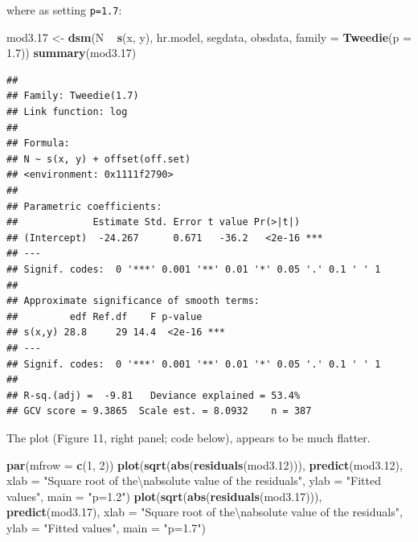 \documentclass[]{amsart}
\newenvironment{Shaded}{}{}
\newcommand{\KeywordTok}[1]{\textcolor[rgb]{0.00,0.44,0.13}{\textbf{{#1}}}}
\newcommand{\DataTypeTok}[1]{\textcolor[rgb]{0.56,0.13,0.00}{{#1}}}
\newcommand{\DecValTok}[1]{\textcolor[rgb]{0.25,0.63,0.44}{{#1}}}
\newcommand{\FloatTok}[1]{\textcolor[rgb]{0.25,0.63,0.44}{{#1}}}
\newcommand{\CharTok}[1]{\textcolor[rgb]{0.25,0.44,0.63}{{#1}}}
\newcommand{\StringTok}[1]{\textcolor[rgb]{0.25,0.44,0.63}{{#1}}}
\newcommand{\NormalTok}[1]{{#1}}
\begin{document}
where as setting \texttt{p=1.7}:

\begin{Shaded}
\begin{Highlighting}[]
\NormalTok{mod3}\FloatTok{.17} \NormalTok{<-}\StringTok{ }\KeywordTok{dsm}\NormalTok{(N ~}\StringTok{ }\KeywordTok{s}\NormalTok{(x, y), hr.model, segdata, obsdata, }
    \DataTypeTok{family =} \KeywordTok{Tweedie}\NormalTok{(}\DataTypeTok{p =} \FloatTok{1.7}\NormalTok{))}
\KeywordTok{summary}\NormalTok{(mod3}\FloatTok{.17}\NormalTok{)}
\end{Highlighting}
\end{Shaded}

\begin{verbatim}
## 
## Family: Tweedie(1.7) 
## Link function: log 
## 
## Formula:
## N ~ s(x, y) + offset(off.set)
## <environment: 0x1111f2790>
## 
## Parametric coefficients:
##             Estimate Std. Error t value Pr(>|t|)    
## (Intercept)  -24.267      0.671   -36.2   <2e-16 ***
## ---
## Signif. codes:  0 '***' 0.001 '**' 0.01 '*' 0.05 '.' 0.1 ' ' 1
## 
## Approximate significance of smooth terms:
##         edf Ref.df    F p-value    
## s(x,y) 28.8     29 14.4  <2e-16 ***
## ---
## Signif. codes:  0 '***' 0.001 '**' 0.01 '*' 0.05 '.' 0.1 ' ' 1
## 
## R-sq.(adj) =  -9.81   Deviance explained = 53.4%
## GCV score = 9.3865  Scale est. = 8.0932    n = 387
\end{verbatim}

The plot (Figure 11, right panel; code below), appears to be much
flatter.

\begin{Shaded}
\begin{Highlighting}[]
\KeywordTok{par}\NormalTok{(}\DataTypeTok{mfrow =} \KeywordTok{c}\NormalTok{(}\DecValTok{1}\NormalTok{, }\DecValTok{2}\NormalTok{))}
\KeywordTok{plot}\NormalTok{(}\KeywordTok{sqrt}\NormalTok{(}\KeywordTok{abs}\NormalTok{(}\KeywordTok{residuals}\NormalTok{(mod3}\FloatTok{.12}\NormalTok{))), }\KeywordTok{predict}\NormalTok{(mod3}\FloatTok{.12}\NormalTok{), }
    \DataTypeTok{xlab =} \StringTok{"Square root of the}\CharTok{\textbackslash{}n}\StringTok{absolute value of the residuals"}\NormalTok{, }
    \DataTypeTok{ylab =} \StringTok{"Fitted values"}\NormalTok{, }\DataTypeTok{main =} \StringTok{"p=1.2"}\NormalTok{)}
\KeywordTok{plot}\NormalTok{(}\KeywordTok{sqrt}\NormalTok{(}\KeywordTok{abs}\NormalTok{(}\KeywordTok{residuals}\NormalTok{(mod3}\FloatTok{.17}\NormalTok{))), }\KeywordTok{predict}\NormalTok{(mod3}\FloatTok{.17}\NormalTok{), }
    \DataTypeTok{xlab =} \StringTok{"Square root of the}\CharTok{\textbackslash{}n}\StringTok{absolute value of the residuals"}\NormalTok{, }
    \DataTypeTok{ylab =} \StringTok{"Fitted values"}\NormalTok{, }\DataTypeTok{main =} \StringTok{"p=1.7"}\NormalTok{)}
\end{Highlighting}
\end{Shaded}
\end{document}
